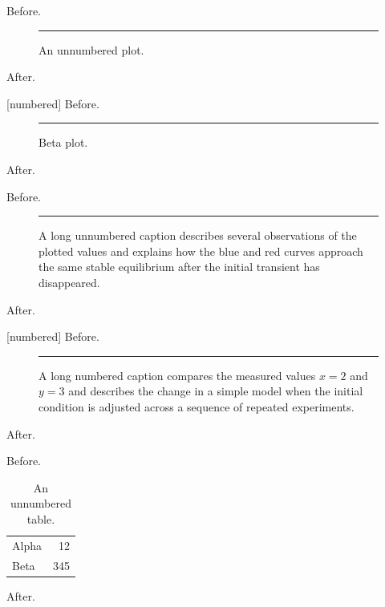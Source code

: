 \documentclass{beamer}
\begin{document}
\begin{frame}[plain,t]
Before.\begin{figure}\rule{40pt}{12pt}\caption*{An unnumbered plot.}\end{figure}After.
\end{frame}
\begin{frame}[plain,t]
[numbered]
Before.\begin{figure}\rule{40pt}{12pt}\caption[Short title]{Alpha plot.}\caption*{Unnumbered aside.}\caption{Beta plot.}\end{figure}After.
\end{frame}
\begin{frame}[plain,t]
Before.\begin{figure}\rule{40pt}{12pt}\caption*{A long unnumbered caption describes several observations of the plotted values and explains how the blue and red curves approach the same stable equilibrium after the initial transient has disappeared.}\end{figure}After.
\end{frame}
\begin{frame}[plain,t]
[numbered]
Before.\begin{figure}\rule{40pt}{12pt}\caption{A long numbered caption compares the measured values $x=2$ and $y=3$ and describes the change in a simple model when the initial condition is adjusted across a sequence of repeated experiments.}\end{figure}After.
\end{frame}
\begin{frame}[plain,t]
Before.\begin{table}\caption*{An unnumbered table.}\begin{tabular}{lr}Alpha&12\\Beta&345\end{tabular}\end{table}After.
\end{frame}
\end{document}
